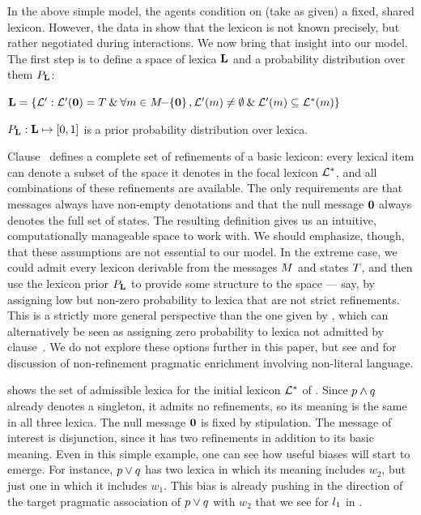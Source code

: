 \documentclass{article}
\begin{document}
In the above simple model, the agents condition on (take as given) a
fixed, shared lexicon. However, the data in  show that
the lexicon is not known precisely, but rather negotiated during
interactions. We now bring that insight into our model. The first step
is to define a space of lexica $\mathbf{L}$ and a probability
distribution over them $P_{\mathbf{L}}$:
%
\begin{examples}
\item\label{model-extend}
  \begin{examples} 
  \item\label{lexset}%
      $\mathbf{L} = 
      \left\{ \mathcal{L}' : 
        \mathcal{L}'(\mathbf{0}) = T \mathbin{\&}
        \forall m \in M{\negthinspace-\negthinspace}\left\{ \mathbf{0} \right\}, 
        \mathcal{L}'(m) \neq \emptyset \mathbin{\&}
        \mathcal{L}'(m) \subseteq \mathcal{L}^{\ast}(m) \right\}$
  \item\label{LexPrior}%
    $P_{\mathbf{L}} : \mathbf{L} \mapsto [0,1]$ is a prior
    probability distribution over lexica.  
  \end{examples}
\end{examples}
%
Clause~ defines a complete set of
refinements of a basic lexicon: every lexical item can denote a subset
of the space it denotes in the focal lexicon $\mathcal{L}^{\ast}$, and all
combinations of these refinements are available. The only requirements
are that messages always have non-empty denotations and that the null
message $\mathbf{0}$ always denotes the full set of states. The
resulting definition gives us an intuitive, computationally manageable
space to work with. We should emphasize, though, that these
assumptions are not essential to our model. In the extreme case, we
could admit every lexicon derivable from the messages $M$ and
states $T$, and then use the lexicon prior $P_{\mathbf{L}}$ to
provide some structure to the space --- say, by assigning low but
non-zero probability to lexica that are not strict refinements. This
is a strictly more general perspective than the one given by
, which can alternatively be seen as assigning zero
probability to lexica not admitted by
clause~. We do not explore these options
further in this paper, but see
\citealt{Kao:Bergen:Goodman:2014,Kao-etal:2014} and for discussion of
non-refinement pragmatic enrichment involving non-literal language.

 shows the set of admissible lexica for the
initial lexicon $\mathcal{L}^{\ast}$ of . Since $p \wedge q$
already denotes a singleton, it admits no refinements, so its meaning
is the same in all three lexica. The null message $\mathbf{0}$ is fixed
by stipulation. The message of interest is disjunction, since it has
two refinements in addition to its basic meaning. Even in this simple
example, one can see how useful biases will start to emerge. For
instance, $p \vee q$ has two lexica in which its meaning includes
$w_{2}$, but just one in which it includes $w_{1}$. This bias is
already pushing in the direction of the target pragmatic association
of $p \vee q$ with $w_{2}$ that we see for $l_{1}$ in
.
\end{document}
